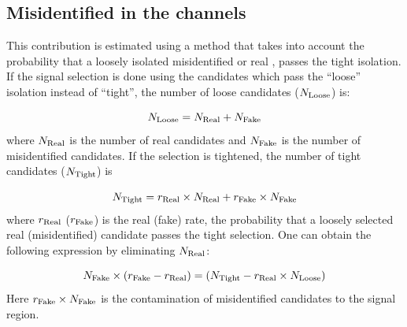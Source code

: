 \subsection{\texorpdfstring{Misidentified \Tau in the \leptonTau channels}{Misidentified tau in the lepton-tau channels}}
\label{sect:bkgFake}
This contribution is estimated using a method that takes into account the probability that a loosely isolated misidentified or real \Tau,
passes the tight isolation.
If the signal selection is done using the \Tau candidates which pass the ``loose'' isolation instead of ``tight'', 
the number of loose \Tau candidates ($N_{\rm Loose}$) is:

\begin{equation}
N_{\rm Loose} = N_{\rm Real} + N_{\rm Fake}
\end{equation}
where $N_{\rm Real}$ is the number of real \Tau candidates and $N_{\rm Fake}$ is the number of misidentified 
\Tau candidates. If the selection is tightened, the number of tight \Tau candidates ($N_{\rm Tight}$)  is

\begin{equation}
 N_{\rm Tight} = r_{\rm Real}\times N_{\rm Real} + r_{\rm Fake}\times N_{\rm Fake}
\end{equation} 
where $r_{\rm Real}$ ($r_{\rm Fake}$) is the real (fake) rate, the probability that a loosely selected real (misidentified) \Tau candidate passes the  tight  selection. 
One can obtain the following expression by eliminating $N_{\rm Real}$:

\begin{equation}
   N_{\rm Fake}\times (r_{\rm Fake}-r_{\rm Real}) = (N_{\rm Tight} - r_{\rm Real}\times N_{\rm Loose})
\end{equation}
Here $r_{\rm Fake}\times N_{\rm Fake}$ is the contamination of misidentified \Tau candidates to the signal region. 


